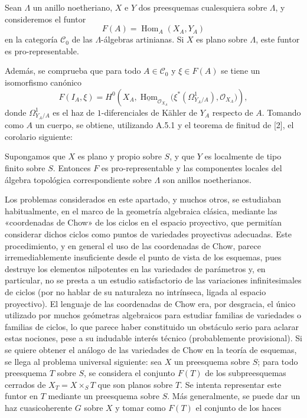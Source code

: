  Sean $\Lambda$ un anillo noetheriano, $X$ e $Y$ dos
preesquemas cualesquiera sobre $\Lambda$, y consideremos el funtor
\[
  F(A)=\operatorname{Hom}_A(X_A,Y_A)
\]
en la categoría $\mathcal C_0$ de las $\Lambda$-álgebras artinianas. Si $X$ es
plano sobre $\Lambda$, este funtor es pro-representable.

Además, se comprueba que para todo $A\in\mathcal C_0$ y $\xi\in F(A)$ se tiene
un isomorfismo canónico
\[
  F(I_A,\xi)=H^0\!\left(
    X_A,
    \underline{\operatorname{Hom}}_{\mathcal O_{X_A}}
    \bigl(\xi^*(\Omega^1_{Y_A/A}),\mathcal O_{X_A}\bigr)
  \right),
\]
donde $\Omega^1_{Y_A/A}$ es el haz de $1$-diferenciales de Kähler de $Y_A$
respecto de $A$. Tomando como $A$ un cuerpo, se obtiene, utilizando A.5.1 y el
teorema de finitud de [2], el corolario siguiente:

 Supongamos que $X$ es plano y propio sobre $S$, y que $Y$
es localmente de tipo finito sobre $S$. Entonces $F$ es pro-representable y las
componentes locales del álgebra topológica correspondiente sobre $\Lambda$ son
anillos noetherianos.

 Los problemas considerados en este apartado, y muchos
otros, se estudiaban habitualmente, en el marco de la geometría algebraica
clásica, mediante las «coordenadas de Chow» de los ciclos en el espacio
proyectivo, que permitían considerar dichos ciclos como puntos de variedades
proyectivas adecuadas. Este procedimiento, y en general el uso de las
coordenadas de Chow, parece irremediablemente insuficiente desde el punto de
vista de los esquemas, pues destruye los elementos nilpotentes en las
variedades de parámetros y, en particular, no se presta a un estudio
satisfactorio de las variaciones infinitesimales de ciclos (por no hablar de su
naturaleza no intrínseca, ligada al espacio proyectivo). El lenguaje de las
coordenadas de Chow era, por desgracia, el único utilizado por muchos
geómetras algebraicos para estudiar familias de variedades o familias de
ciclos, lo que parece haber constituido un obstáculo serio para aclarar estas
nociones, pese a su indudable interés técnico (probablemente provisional). Si
se quiere obtener el análogo de las variedades de Chow en la teoría de
esquemas, se llega al problema universal siguiente: sea $X$ un preesquema sobre
$S$; para todo preesquema $T$ sobre $S$, se considera el conjunto $F(T)$ de los
subpreesquemas cerrados de $X_T=X\times_ST$ que son planos sobre $T$. Se intenta
representar este funtor en $T$ mediante un preesquema sobre $S$. Más
generalmente, se puede dar un haz cuasicoherente $G$ sobre $X$ y tomar como
$F(T)$ el conjunto de los haces

